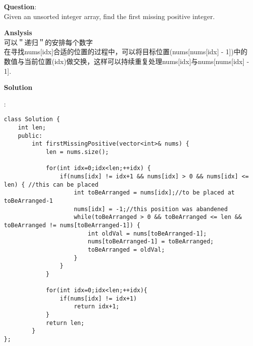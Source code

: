     
\begin{description}
    \item{\textbf{Question}}:\\%
		Given an unsorted integer array, find the first missing positive integer.\\

    \item{\textbf{Anslysis}}\\
		可以＂递归＂的安排每个数字\\
		在寻找nums[idx]合适的位置的过程中，可以将目标位置(nums[nums[idx] - 1])中的数值与当前位置(idx)做交换，这样可以持续重复处理nums[idx]与nums[nums[idx] - 1].\\

    \item{\textbf{Solution}}\\
	\item{} : \\
		\begin{lstlisting}
class Solution {
	int len;
	public:
		int firstMissingPositive(vector<int>& nums) {
			len = nums.size();

			for(int idx=0;idx<len;++idx) {
				if(nums[idx] != idx+1 && nums[idx] > 0 && nums[idx] <= len) { //this can be placed
					int toBeArranged = nums[idx];//to be placed at toBeArranged-1
					nums[idx] = -1;//this position was abandened
					while(toBeArranged > 0 && toBeArranged <= len && toBeArranged != nums[toBeArranged-1]) {
						int oldVal = nums[toBeArranged-1];
						nums[toBeArranged-1] = toBeArranged;
						toBeArranged = oldVal;
					}
				}
			}

			for(int idx=0;idx<len;++idx){
				if(nums[idx] != idx+1)
					return idx+1;
			}
			return len;
		}
};
		\end{lstlisting}

\end{description}

